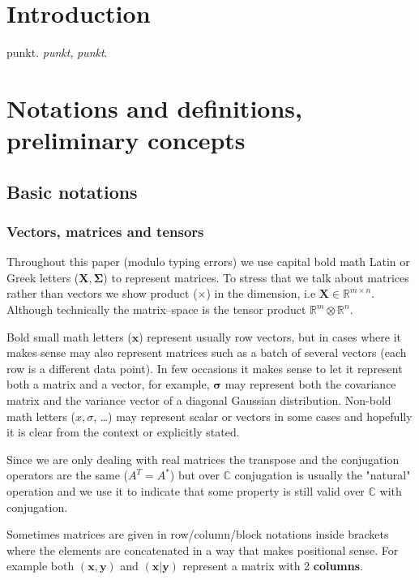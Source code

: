 \documentclass[11pt, a4paper]{report}
\theoremstyle{plain}
\theoremstyle{definition}
\theoremstyle{remark}
\newcommand{\C}{\mathbb{C}}
\newcommand{\R}{\mathbb{R}}
\newcommand{\x}{\mathbf{x}}
\newcommand{\y}{\mathbf{y}}
\newcommand{\bv}[1]{\boldsymbol{#1}}
\begin{document}
\listoftables

\listoffigures

\tableofcontents

\chapter{Introduction} punkt. \emph{punkt}, \textit{punkt}.

\chapter{Notations and definitions, preliminary concepts}

\section{Basic notations}
\subsection{Vectors, matrices and tensors}
Throughout this paper (modulo typing errors) we use
capital bold math Latin or Greek letters ($\bv{X, \Sigma}$) to represent
matrices. To stress that we talk about matrices rather than vectors we show
product ($\times$) in the dimension, i.e $\bv{X} \in \R^{m \times n}$. Although
technically the matrix--space is the tensor product $\R^m \otimes \R^n$.

Bold small math letters ($\bv{x}$) represent usually row vectors, but in cases
where it makes sense may also represent matrices such as a batch of several
vectors (each row is a different data point). In few occasions it makes sense to
let it represent both a matrix and a vector, for example, $\bv{\sigma}$ may
represent both the covariance matrix and the variance vector of a diagonal
Gaussian distribution. Non-bold math letters ($x, \sigma$, \dots) may represent
scalar or vectors in some cases and hopefully it is clear from the context or
explicitly stated.

Since we are only dealing with real matrices the transpose and the conjugation
operators are the same ($A^T = A^*$) but over $\C$ conjugation is
usually the "natural" operation and we use it to indicate that some property is
still valid over $\C$ with conjugation.

Sometimes matrices are given in row/column/block notations inside brackets where
the elements are concatenated in a way that makes positional sense.
For example
both $(\x,\y)$ and $(\x | \y)$ represent a matrix with 2 \textbf{columns}.
\end{document}
